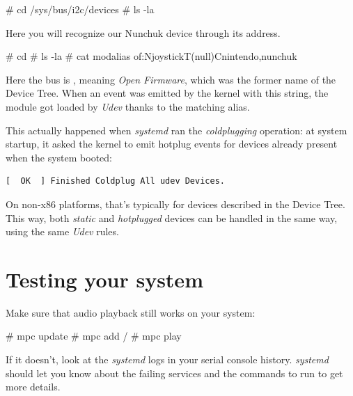 \begin{bashinput}
# cd /sys/bus/i2c/devices
# ls -la
\end{bashinput}

Here you will recognize our Nunchuk device through its 
address.

\begin{bashinput}
# cd %
# ls -la
# cat modalias
of:NjoystickT(null)Cnintendo,nunchuk
\end{bashinput}

Here the bus is , meaning {\em Open Firmware}, which
was the former name of the Device Tree. When an event was emitted by
the kernel with this  string, the  module
got loaded by {\em Udev} thanks to the matching alias.

This actually happened when {\em systemd} ran the {\em coldplugging}
operation: at system startup, it asked the kernel to emit hotplug events
for devices already present when the system booted:

\begin{verbatim}
[  OK  ] Finished Coldplug All udev Devices.
\end{verbatim}

On non-x86 platforms, that's typically for devices described in the
Device Tree. This way, both {\em static} and {\em hotplugged} devices
can be handled in the same way, using the same {\em Udev} rules.

\section{Testing your system}

Make sure that audio playback still works on your system:

\begin{bashinput}
# mpc update
# mpc add /
# mpc play
\end{bashinput}

If it doesn't, look at the {\em systemd} logs in your serial console
history. {\em systemd} should let you know about the failing services
and the commands to run to get more details.
